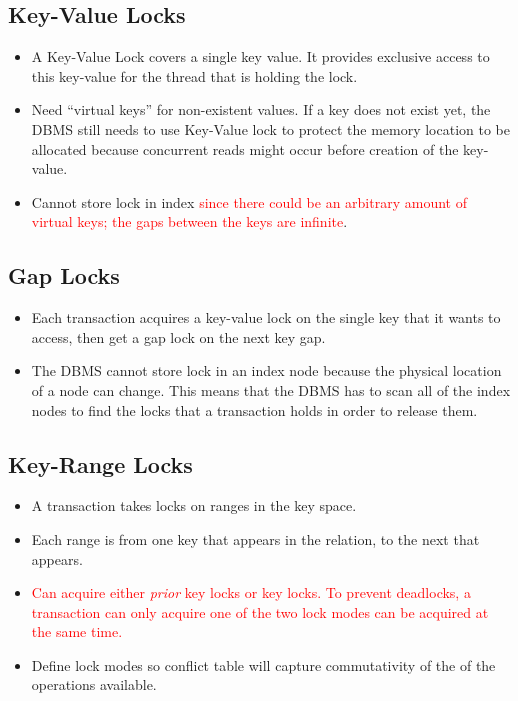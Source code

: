 \documentclass[11pt]{article}
\newcommand{\rr}[1]{\textcolor{red}{#1}}
\begin{document}
\subsection*{Key-Value Locks}
\begin{itemize}
    \item A Key-Value Lock covers a single key value. It provides exclusive access to this key-value for the thread that is holding the lock.
    \item Need ``virtual keys'' for non-existent values. If a key does not exist yet, the DBMS still needs to use Key-Value lock to protect the memory location to be allocated because concurrent reads might occur before creation of the key-value. 
    \item Cannot store lock in index \rr{since there could be an arbitrary amount of virtual keys; the gaps between the keys are infinite}.
\end{itemize}

\subsection*{Gap Locks}
\begin{itemize}
    \item
    Each transaction acquires a key-value lock on the single key that it wants to access, then get 
    a gap lock on the next key gap.
    
    \item
    The DBMS cannot store lock in an index node because the physical location of a node can change.
    This means that the DBMS has to scan all of the index nodes to find the locks that a 
    transaction holds in order to release them.
\end{itemize}

\subsection*{Key-Range Locks}
\begin{itemize}
    \item
    A transaction takes locks on ranges in the key space.
    
    \item
    Each range is from one key that appears in the relation, to the next that appears.
    
    \item
    \rr{Can acquire either \textit{prior} key locks or  key locks. To prevent deadlocks, a transaction can only acquire one of the two lock modes can be acquired at the same time.}
    
    \item
    Define lock modes so conflict table will capture commutativity of the of the operations 
    available.
\end{itemize}
\end{document}
